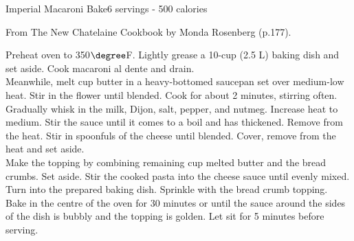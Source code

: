 \begin{recipe}{Imperial Macaroni Bake}{6 servings - 500 calories}{}

\freeform From {\normalfont The New Chatelaine Cookbook} by Monda Rosenberg (p.177).


Preheat oven to 350$\degree$F. Lightly grease a 10-cup (2.5 L) baking dish and set aside. Cook macaroni al dente and drain.\\

Meanwhile, melt  cup butter in a heavy-bottomed saucepan set over medium-low heat. Stir in the flower until blended. Cook for about 2 minutes, stirring often. Gradually whisk in the milk, Dijon, salt, pepper, and nutmeg. Increase heat to medium. Stir the sauce until it comes to a boil and has thickened. Remove from the heat. Stir in spoonfuls of the cheese until blended. Cover, remove from the heat and set aside.\\

Make the topping by combining remaining  cup melted butter and the bread crumbs. Set aside. Stir the cooked pasta into the cheese sauce until evenly mixed. Turn into the prepared baking dish. Sprinkle with the bread crumb topping.\\

Bake in the centre of the oven for 30 minutes or until the sauce around the sides of the dish is bubbly and the topping is golden. Let sit for 5 minutes before serving.

\end{recipe}